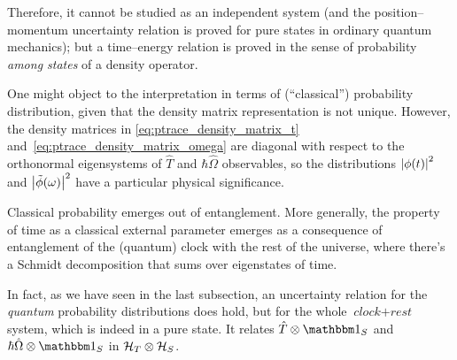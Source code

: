 Therefore, it cannot be studied as an independent system
(and the position--momentum uncertainty relation is proved
for pure states in ordinary quantum mechanics); but a
time--energy relation is proved in the sense of probability
\emph{among states} of a density operator.

One might object to the interpretation in terms of (``classical'')
probability distribution, given
that the density matrix representation is
not unique.
However, the density matrices
in \eqref{eq:ptrace_density_matrix_t} and~\eqref{eq:ptrace_density_matrix_omega}
are diagonal with respect to
the orthonormal eigensystems of $\hat{T}$ and $\hbar \hat{\Omega}$ observables,
so the distributions $\abs{\phi(t)}^2$ and $\abs{\tilde{\phi}(\omega)}^2$
have a particular physical significance.

Classical probability emerges out of entanglement. More generally,
the property of time as a classical external parameter emerges as
a consequence of entanglement of the (quantum) clock
with the rest of the universe, where there's a Schmidt decomposition
that sums over eigenstates of time.

In fact, as we have seen in the last subsection,
an uncertainty relation for the \emph{quantum} probability distributions does hold,
but for the whole
$\textit{clock} + \textit{rest}$ system, which is indeed in a pure state.
It relates $\hat{T}\ox\idop_S$ and $\hbar\hat{\Omega}\ox\idop_S$
in $\mathcal{H}_T \otimes \mathcal{H}_S$.
